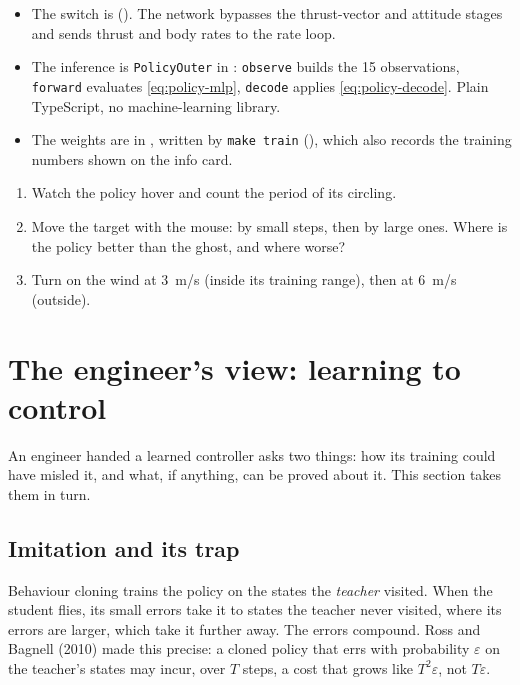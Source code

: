 \begin{inapp}
\begin{itemize}[leftmargin=1.2em]
  \item The switch is  (). The network bypasses the thrust-vector and attitude stages and sends thrust and body rates to the rate loop.
  \item The inference is \texttt{PolicyOuter} in : \texttt{observe} builds the 15 observations, \texttt{forward} evaluates \cref{eq:policy-mlp}, \texttt{decode} applies \cref{eq:policy-decode}. Plain TypeScript, no machine-learning library.
  \item The weights are in , written by \texttt{make train} (), which also records the training numbers shown on the info card.
\end{itemize}
\end{inapp}

\begin{trythis}
\begin{enumerate}
  \item Watch the policy hover and count the period of its circling.
  \item Move the target with the mouse: by small steps, then by large ones. Where is the policy better than the ghost, and where worse?
  \item Turn on the wind at \SI{3}{m/s} (inside its training range), then at \SI{6}{m/s} (outside).
\end{enumerate}
\end{trythis}

\section{The engineer's view: learning to control}

An engineer handed a learned controller asks two things: how its training could have misled it, and what, if anything, can be proved about it. This section takes them in turn.

\subsection{Imitation and its trap}
Behaviour cloning trains the policy on the states the \emph{teacher} visited. When the student flies, its small errors take it to states the teacher never visited, where its errors are larger, which take it further away. The errors compound. Ross and Bagnell (2010) made this precise: a cloned policy that errs with probability $\varepsilon$ on the teacher's states may incur, over $T$ steps, a cost that grows like $T^2\varepsilon$, not $T\varepsilon$.

